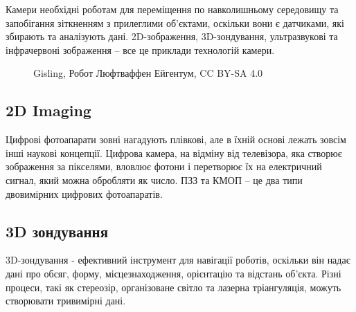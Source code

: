 \documentclass[a4paper,14pt]{extreport}
\begin{document}
Камери необхідні роботам для переміщення по навколишньому середовищу та запобігання зіткненням з прилеглими об'єктами, оскільки вони є датчиками, які збирають та аналізують дані. 2D-зображення, 3D-зондування, ультразвукові та інфрачервоні зображення – все це приклади технологій камери.

\begin{figure}[h!]
   \caption{  Gisling, Робот Люфтваффен Ейгентум, CC BY-SA 4.0}
 \end{figure}

\subsection{2D Imaging}
Цифрові фотоапарати зовні нагадують плівкові, але в їхній основі лежать зовсім інші наукові концепції. Цифрова камера, на відміну від телевізора, яка створює зображення за пікселями, вловлює фотони і перетворює їх на електричний сигнал, який можна обробляти як число. ПЗЗ та КМОП – це два типи двовимірних цифрових фотоапаратів.

\subsection{3D зондування}
3D-зондування - ефективний інструмент для навігації роботів, оскільки він надає дані про обсяг, форму, місцезнаходження, орієнтацію та відстань об'єкта. Різні процеси, такі як стереозір, організоване світло та лазерна тріангуляція, можуть створювати тривимірні дані.
\end{document}
